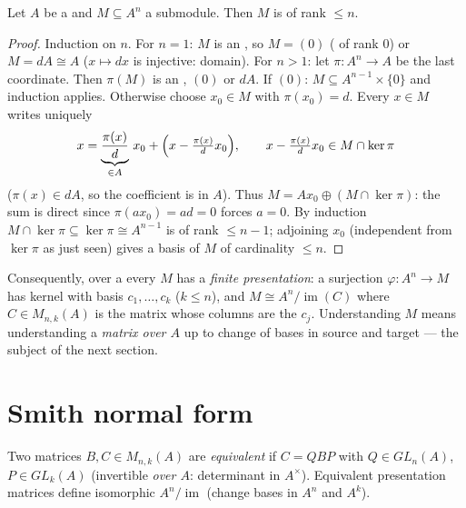 \begin{theorem}\label{thm:b3:modules:submodule}
Let $A$ be a  and $M \subseteq A^n$ a submodule. Then $M$ is
 of rank $\leq n$.
\end{theorem}

\begin{proof}
Induction on $n$. For $n = 1$: $M$ is an , so $M = (0)$
( of rank $0$) or $M = dA \cong A$ ($x \mapsto dx$ is
injective: domain). For $n > 1$: let $\pi \colon A^n \to A$ be the
last coordinate. Then $\pi(M)$ is an , $(0)$ or $dA$. If
$(0)$: $M \subseteq A^{n-1} \times \{0\}$ and induction applies.
Otherwise choose $x_0 \in M$ with $\pi(x_0) = d$. Every $x \in M$
writes uniquely
\[
x = \underbrace{\frac{\pi(x)}{d}}_{\in A}\, x_0 +
\Bigl(x - \tfrac{\pi(x)}d x_0\Bigr),
\qquad x - \tfrac{\pi(x)}d x_0 \in M \cap \ker\pi
\]
($\pi(x) \in dA$, so the coefficient is in $A$). Thus $M = Ax_0
\oplus (M \cap \ker \pi)$: the sum is direct since $\pi(ax_0) =
ad = 0$ forces $a = 0$. By induction $M \cap \ker\pi \subseteq
\ker \pi \cong A^{n-1}$ is  of rank $\leq n - 1$; adjoining
$x_0$ (independent from $\ker\pi$ as just seen) gives a basis of
$M$ of cardinality $\leq n$.
\end{proof}

\begin{remark}\label{rem:b3:modules:presentation}
Consequently, over a  every  $M$ has a
\emph{finite presentation}: a surjection $\varphi\colon A^n \to M$
has  kernel with basis $c_1, \dots, c_k$ ($k \leq n$), and $M
\cong A^n / \operatorname{im}(C)$ where $C \in M_{n,k}(A)$ is the
matrix whose columns are the $c_j$. Understanding $M$ means
understanding a \emph{matrix over $A$} up to change of bases in
source and target --- the subject of the next section.
\end{remark}

\section{Smith normal form}

\begin{definition}\label{def:b3:modules:equivalence}
Two matrices $B, C \in M_{n,k}(A)$ are \emph{equivalent} if $C =
QBP$ with $Q \in GL_n(A)$, $P \in GL_k(A)$ (invertible
\emph{over $A$}: determinant in $A^\times$). Equivalent
presentation matrices define isomorphic  $A^n/
\operatorname{im}$ (change bases in $A^n$ and $A^k$).
\end{definition}

